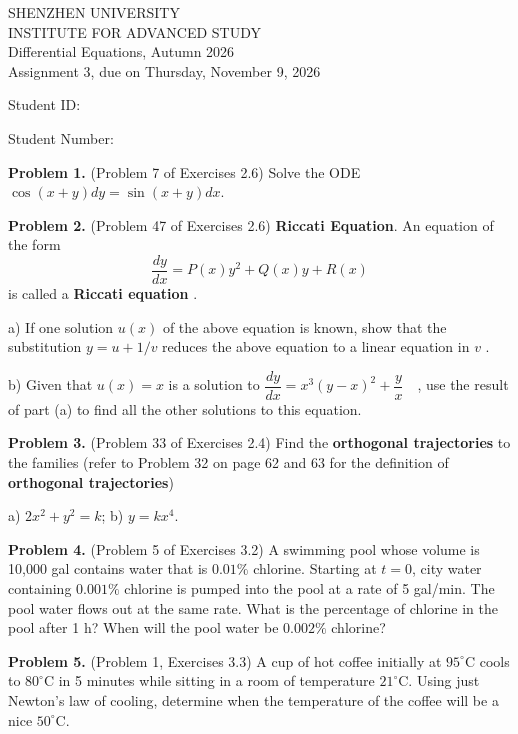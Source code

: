 \documentclass[11pt,a4paper]{article}
\begin{document}
\begin{center}
SHENZHEN UNIVERSITY \\
INSTITUTE FOR ADVANCED STUDY \\
 Differential Equations, Autumn 2026 \\
Assignment 3, due  on Thursday, November 9, 2026
\end{center}

\begin{center}
    Student ID:
\end{center}

\begin{center}
    Student Number:
\end{center}
\noindent
{\bf Problem 1.} (Problem 7 of Exercises 2.6)
Solve the ODE $\cos (x+y)dy=\sin (x+y)dx$.

\bigskip
\noindent
{\bf Problem 2.} (Problem 47 of Exercises 2.6) {{\bf Riccati Equation}}. An equation of the form
\[
\dfrac{dy}{dx}=P(x)y^2+Q(x)y+R(x)
\]
is called a  {\bf Riccati equation }.

a) If one solution $u(x)$ of the above equation is known, show that the substitution $y=u+1/v$ reduces the above equation to a linear equation in $v$ .

b) Given that $u(x)=x$ is a solution to $\dfrac {dy}{dx}=x^3(y-x)^2+\dfrac {y}{x} \quad$,
use the result of part (a) to find all the other solutions to this equation.

\bigskip
\noindent
{\bf Problem 3.} (Problem 33 of Exercises 2.4)
Find the {\bf orthogonal trajectories} to the families (refer to Problem 32 on page 62 and 63 for the definition of  {\bf orthogonal trajectories})

a)  $2x^2 + y^2 = k$; \;\;\;\; b) $y = k x^4$.

\bigskip
\noindent
{\bf Problem 4.} (Problem 5 of Exercises 3.2) A swimming pool whose volume is 10,000 gal contains water
that is $0.01\%$ chlorine. Starting at $t=0$, city water containing
$0.001\%$ chlorine is pumped into the pool at a rate of 5 gal/min. The pool water flows out at the same rate.
What is the percentage of chlorine in the pool after 1 h? When will the pool water be $0.002\%$ chlorine?



\bigskip
\noindent
{\bf Problem 5.} (Problem 1, Exercises 3.3) A cup of hot coffee initially at $95^{\circ}$C cools to $80^{\circ}$C in 5 minutes while
sitting in a room of temperature $21^{\circ}$C. Using just Newton's law of cooling, determine when the temperature of the coffee will be
a nice $50^{\circ}$C.
\end{document}
